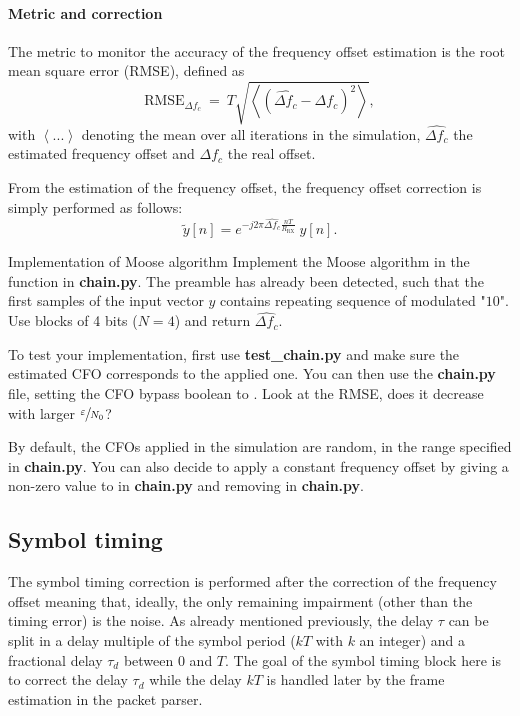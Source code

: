 \paragraph{Metric and correction}
The metric to monitor the accuracy of the frequency offset estimation is the root mean square error (RMSE), defined as
\begin{equation*}
    \text{RMSE}_{\Delta f_c}\:=\:T\sqrt{\left\langle\left(\widehat{\Delta f_c}-\Delta f_c\right)^2\right\rangle},
\end{equation*}
with $\left\langle ... \right\rangle$ denoting the mean over all iterations in the simulation, $\widehat{\Delta f_c}$ the estimated frequency offset and $\Delta f_c$ the real offset.

From the estimation of the frequency offset, the frequency offset correction is simply performed as follows:
\begin{equation*}
    \tilde{y}[n] = e^{-j2\pi \widehat{\Delta f_c} \frac{nT}{R_{\text{RX}}}}\:y[n].
\end{equation*}


\begin{bclogo}[couleur = gray!20, arrondi = 0.2, logo=\bccrayon]{Implementation of Moose algorithm}
Implement the Moose algorithm in the  function in \textbf{chain.py}. The preamble has already been detected, such that the first samples of the input vector $y$ contains repeating sequence of modulated "$10$". Use blocks of 4 bits ($N=4$) and return $\widehat{\Delta f_c}$.

To test your implementation, first use \textbf{test\_chain.py} and make sure the estimated CFO corresponds to the applied one. You can then use the \textbf{chain.py} file, setting the CFO bypass boolean to . Look at the RMSE, does it decrease with larger $\sfrac{\varepsilon}{N_0}$?

By default, the CFOs applied in the simulation are random, in the range specified in \textbf{chain.py}. You can also decide to apply a constant frequency offset by giving a non-zero value to  in \textbf{chain.py} and removing  in \textbf{chain.py}.
\end{bclogo}



\subsection{Symbol timing}
The symbol timing correction is performed after the correction of the frequency offset meaning that, ideally, the only remaining impairment (other than the timing error) is the noise. As already mentioned previously, the delay $\tau$ can be split in a delay multiple of the symbol period ($kT$ with $k$ an integer) and a fractional delay $\tau_d$ between 0 and $T$. The goal of the symbol timing block here is to correct the delay $\tau_d$ while the delay $kT$ is handled later by the frame estimation in the packet parser.

